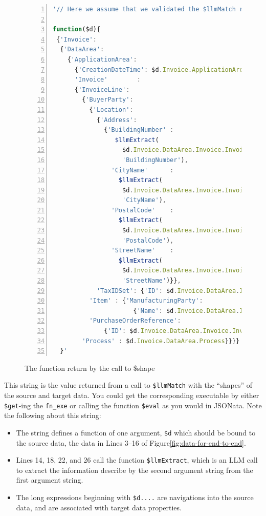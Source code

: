 \documentclass[10pt,letterpaper]{article} %
\newcommand{\stt}[1]{\texttt{#1}} %
\begin{document}
\begin{figure}[H]
  \caption{The function return by the call to \$shape}
  \label{fig:function-returned-from-shape-call}
\begin{lstlisting}[language=JavaScript,numberstyle=\scriptsize,basicstyle=\ttfamily\scriptsize,numbers=left,stepnumber=1,breaklines=true]
'// Here we assume that we validated the $llmMatch result, and stored it as this.

function($d){
 {'Invoice':
  {'DataArea':
    {'ApplicationArea':
      {'CreationDateTime': $d.Invoice.ApplicationArea.CreationDateTime},
      'Invoice'        :
      {'InvoiceLine':
        {'BuyerParty':
          {'Location':
            {'Address':
              {'BuildingNumber' :
                 $llmExtract(
                   $d.Invoice.DataArea.Invoice.InvoiceLine.BuyerParty.Location.Address.AddressLine,
                   'BuildingNumber'),
                'CityName'      :
                  $llmExtract(
                   $d.Invoice.DataArea.Invoice.InvoiceLine.BuyerParty.Location.Address.AddressLine,
                   'CityName'),
                'PostalCode'    :
                  $llmExtract(
                   $d.Invoice.DataArea.Invoice.InvoiceLine.BuyerParty.Location.Address.AddressLine,
                   'PostalCode'),
                'StreetName'    :
                  $llmExtract(
                   $d.Invoice.DataArea.Invoice.InvoiceLine.BuyerParty.Location.Address.AddressLine,
                   'StreetName')}},
            'TaxIDSet': {'ID': $d.Invoice.DataArea.Invoice.InvoiceLine.BuyerParty.TaxIDSet.ID}},
          'Item' : {'ManufacturingParty':
                      {'Name': $d.Invoice.DataArea.Invoice.InvoiceLine.Item.ManufacturingParty.Name}},
          'PurchaseOrderReference':
              {'ID': $d.Invoice.DataArea.Invoice.InvoiceHeader.PurchaseOrderReference.ID}},
        'Process' : $d.Invoice.DataArea.Process}}}}
  }'
\end{lstlisting}
\end{figure}

This string is the value returned from a call to \stt{\$llmMatch} with the ``shapes'' of the source and target data.
You could get the corresponding executable by either \stt{\$get}-ing the \stt{fn\_exe} or calling the function \stt{\$eval} as you would in JSONata.
Note the following about this string:
\begin{itemize}
   \item{The string defines a function of one argument, \stt{\$d} which should be bound to the source data, the data in Lines 3--16 of Figure\ref{fig:data-for-end-to-end}}.
   \item{Lines 14, 18, 22, and 26 call the function \stt{\$llmExtract}, which is an LLM call to extract the information describe by the second argument string from the first argument string.}
   \item{The long expressions beginning with \stt{\$d....} are navigations into the source data, and are associated with target data properties.}
   \end{itemize}
\end{document}

